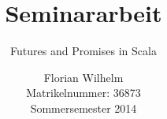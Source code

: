\titlehead{
	\texttt{[image: pic/500px-Hska\_logo.png]}
}
\title{Seminararbeit}
\subtitle{Futures and Promises in Scala}
\author{Florian Wilhelm \\
		Matrikelnummer: 36873\\
		Sommersemester 2014}
\publishers{
    \textbf{Betreuer:} Prof. Dr. Martin Sulzmann
}
\maketitle
